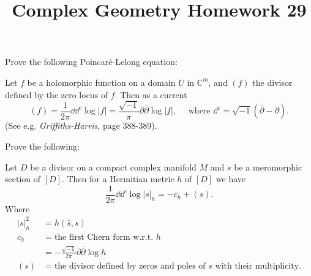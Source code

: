 \documentclass[12pt]{article}
\title{Complex Geometry Homework 29}
\author{}
\date{}
\begin{document}
\maketitle
\begin{problem}
  Prove the following Poincaré-Lelong equation: 

  Let \(f\) be a holomorphic function on a domain \(U\) in \(\mathbb{C}^m\), and
  \((f)\) the divisor defined by the zero locus of \(f\). Then as a current \[
    (f)=\frac{1}{2\pi}\dd \dd^c \log|f|=\frac{\sqrt{-1}}{\pi}\partial\bar{\partial}
    \log|f|,\quad \text{ where }\dd^c=\sqrt{-1}(\bar{\partial}-\partial)
  .\] (See e.g. \emph{Griffiths-Harris}, page 388-389).
\end{problem}
\begin{problem}
  Prove the following:

  Let \(D\) be a divisor on a compact complex manifold \(M\) and \(s\) be a
  meromorphic section of \([D]\). Then for a Hermitian metric \(h\) of \([D]\) we
  have \[
    \frac{1}{2\pi}\dd \dd^c \log|s|_h=-c_h+(s)
  .\] Where 
  \begin{align*}
    |s|^2_h&=h(\bar{s},s) \\
    c_h&=\text{the first Chern form w.r.t. }h \\
    &=-\frac{\sqrt{-1}}{2\pi}\partial\bar{\partial}\log h \\
    (s)&=\text{the divisor defined by zeros and poles of }s\text{ with their
    multiplicity}
  .\end{align*}
\end{problem}
\end{document}
